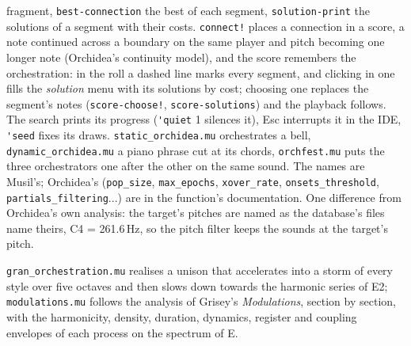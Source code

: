 \documentclass[11pt,a4paper]{article}
\newcommand{\musil}[1]{\lstinline[style=musilinline]{#1}}
\begin{document}
fragment, \musil{best-connection} the best of each segment, \musil{solution-print} the
solutions of a segment with their costs. \musil{connect!} places a connection in a score, a
note continued across a boundary on the same player and pitch becoming one longer note
(Orchidea's continuity model), and the score remembers the orchestration: in the roll a
dashed line marks every segment, and clicking in one fills the \emph{solution} menu with its
solutions by cost; choosing one replaces the segment's notes (\musil{score-choose!},
\musil{score-solutions}) and the playback follows. The search prints its progress
(\musil{'quiet} 1 silences it), Esc interrupts it in the IDE, \musil{'seed} fixes its draws.
\texttt{static\_orchidea.mu} orchestrates a bell, \texttt{dynamic\_orchidea.mu} a piano
phrase cut at its chords, \texttt{orchfest.mu} puts the three orchestrators one after the
other on the same sound. The names are Musil's; Orchidea's (\texttt{pop\_size},
\texttt{max\_epochs}, \texttt{xover\_rate}, \texttt{onsets\_threshold},
\texttt{partials\_filtering}...) are in the function's documentation. One difference from
Orchidea's own analysis: the target's pitches are named as the database's files name theirs,
C4 = 261.6\,Hz, so the pitch filter keeps the sounds at the target's pitch.

\texttt{gran\_orchestration.mu} realises a unison that accelerates into a storm of every
style over five octaves and then slows down towards the harmonic series of E2;
\texttt{modulations.mu} follows the analysis of Grisey's \emph{Modulations}, section by
section, with the harmonicity, density, duration, dynamics, register and coupling envelopes
of each process on the spectrum of E.
\end{document}
